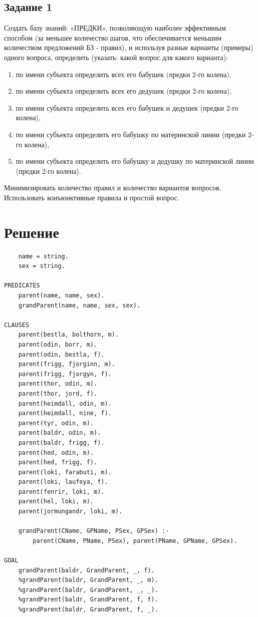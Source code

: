 \documentclass[12pt]{report}
\begin{document}
\section*{Задание 1}
Создать базу знаний: «ПРЕДКИ», позволяющую наиболее эффективным способом (за меньшее количество шагов, что обеспечивается меньшим количеством предложений БЗ - правил), и используя разные варианты (примеры) одного вопроса, определить (указать: какой вопрос для какого варианта):
\begin{enumerate}
    \item по имени субъекта определить всех его бабушек (предки 2-го колена),
    \item по имени субъекта определить всех его дедушек (предки 2-го колена),
    \item по имени субъекта определить всех его бабушек и дедушек (предки 2-го
колена),
    \item по имени субъекта определить его бабушку по материнской линии (предки 2-го колена),
    \item по имени субъекта определить его бабушку и дедушку по материнской линии (предки 2-го колена).
\end{enumerate}
Минимизировать количество правил и количество вариантов вопросов. Использовать конъюнктивные правила и простой вопрос.

\chapter*{Решение}
\begin{lstlisting}
	name = string.
	sex = string.

PREDICATES
	parent(name, name, sex).
	grandParent(name, name, sex, sex).

CLAUSES
	parent(bestla, bolthorn, m).
	parent(odin, borr, m).
	parent(odin, bestla, f).
	parent(frigg, fjorginn, m).
	parent(frigg, fjorgyn, f).
	parent(thor, odin, m).
	parent(thor, jord, f).
	parent(heimdall, odin, m).
	parent(heimdall, nine, f).
	parent(tyr, odin, m).
	parent(baldr, odin, m).
	parent(baldr, frigg, f).
	parent(hed, odin, m).
	parent(hed, frigg, f).
	parent(loki, farabuti, m).
	parent(loki, laufeya, f).
	parent(fenrir, loki, m).
	parent(hel, loki, m).
	parent(jormungandr, loki, m).
	
	grandParent(CName, GPName, PSex, GPSex) :- 
		parent(CName, PName, PSex), parent(PName, GPName, GPSex).

GOAL
	grandParent(baldr, GrandParent, _, f).
	%grandParent(baldr, GrandParent, _, m).
	%grandParent(baldr, GrandParent, _, _).
	%grandParent(baldr, GrandParent, f, f).
	%grandParent(baldr, GrandParent, f, _).
\end{lstlisting}
\end{document}
